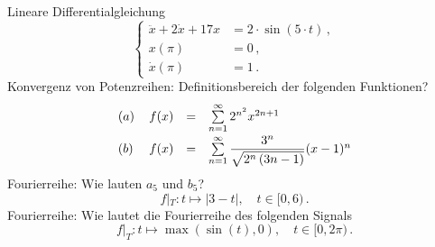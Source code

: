 \documentclass[a4paper, 10pt]{article}
\begin{document}
{
	Lineare Differentialgleichung
	\[ \begin{cases} \ddot x + 2 \dot x + 17 x &= 2 \cdot \sin(5\cdot t)\,,\\ x(\pi) &= 0\,,\\ \dot x(\pi) &= 1\,.\end{cases} \]
	Konvergenz von Potenzreihen: Definitionsbereich der folgenden Funktionen?
	\begin{eqnarray*}
		\begin{array}{l r c l}
			(a) \, & f(x) &=& \sum\limits_{n=1}^\infty 2^{n^2} x^{2n+1} \\[2ex]
	(b) \, & f(x) &=& \sum\limits_{n=1}^\infty \dfrac{3^n}{\sqrt{ 2^n\left( 3n-1\right) }} (x-1)^n
	\end{array}
	\end{eqnarray*}
	Fourierreihe: Wie lauten \(a_5\) und \(b_5\)? \[ f|_T: t\mapsto |3-t|, \quad t\in [0,6)\,.\]
	Fourierreihe: Wie lautet die Fourierreihe des folgenden Signals \[ f|_T: t\mapsto \max\left( \sin(t),0\right), \quad t\in [0,2\pi)\,.\]


}
\end{document}
